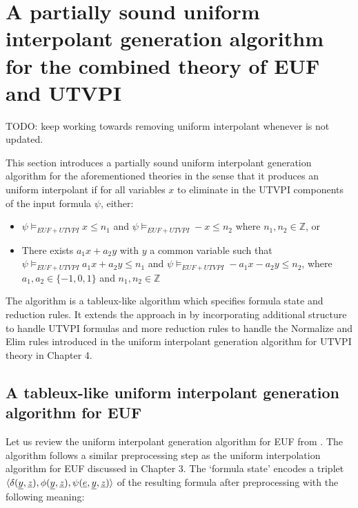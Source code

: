 \section{A partially sound 
  uniform interpolant generation algorithm 
  for the combined theory of EUF and UTVPI}

TODO: keep working towards removing uniform interpolant
whenever is not updated.

This section introduces a partially sound uniform interpolant
generation algorithm for the aforementioned theories in the
sense that it produces an uniform interpolant if for
all variables $x$ to eliminate in the UTVPI components
of the input formula $\psi$, either:
\begin{itemize}
  \item $\psi \models_{EUF + UTVPI} x \leq n_1$
    and $\psi \models_{EUF + UTVPI} -x \leq n_2$ where
    $n_1, n_2 \in \mathbb{Z}$, or
  \item There exists $a_1 x + a_2 y$ with $y$ a common
    variable such that \\
    $\psi \models_{EUF + UTVPI} a_1 x + a_2 y \leq n_1$ and
    $\psi \models_{EUF + UTVPI} -a_1 x - a_2 y \leq n_2$, 
    where $a_1, a_2 \in \{-1, 0, 1\}$ and 
    $n_1, n_2 \in \mathbb{Z}$
\end{itemize}

The algorithm is a tableux-like algorithm which specifies
formula state and reduction rules.
It extends the approach in \cite{ghilardi2020compactly}
by incorporating additional structure to handle 
UTVPI formulas and more reduction rules to handle
the Normalize and Elim rules introduced in the
uniform interpolant generation algorithm for
UTVPI theory in Chapter 4. 

\subsection{A tableux-like uniform interpolant 
  generation algorithm for EUF}

Let us review the uniform interpolant generation algorithm
for EUF from \cite{ghilardi2020compactly}. The algorithm follows a
similar preprocessing step as the uniform interpolation algorithm for EUF 
discussed in Chapter 3. The `formula state'
encodes a triplet $\langle \delta(\underline{y}, \underline{z}), 
\phi(\underline{y}, \underline{z}), \psi(\underline{e}, \underline{y}, \underline{z})
\rangle$ of the resulting formula after preprocessing 
with the following meaning:


